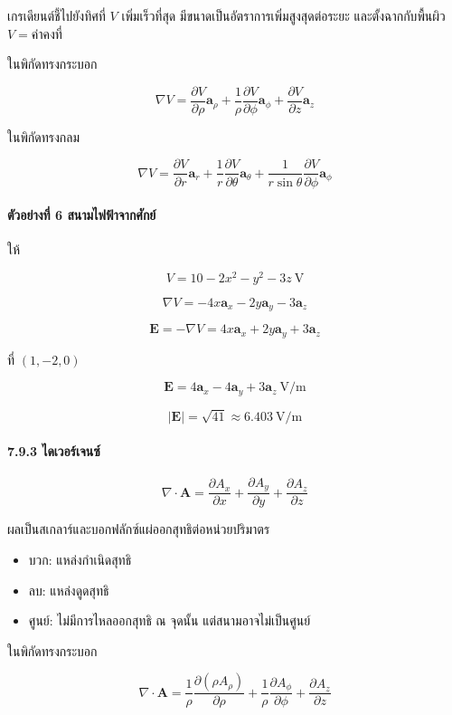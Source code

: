 เกรเดียนต์ชี้ไปยังทิศที่ \(V\) เพิ่มเร็วที่สุด มีขนาดเป็นอัตราการเพิ่มสูงสุดต่อระยะ และตั้งฉากกับพื้นผิว \(V=\text{ค่าคงที่}\)

ในพิกัดทรงกระบอก

\[
\nabla V=
\frac{\partial V}{\partial\rho}\mathbf{a}_\rho+
\frac{1}{\rho}\frac{\partial V}{\partial\phi}\mathbf{a}_\phi+
\frac{\partial V}{\partial z}\mathbf{a}_z
\]

ในพิกัดทรงกลม

\[
\nabla V=
\frac{\partial V}{\partial r}\mathbf{a}_r+
\frac{1}{r}\frac{\partial V}{\partial\theta}\mathbf{a}_\theta+
\frac{1}{r\sin\theta}\frac{\partial V}{\partial\phi}\mathbf{a}_\phi
\]

\paragraph{ตัวอย่างที่ 6 สนามไฟฟ้าจากศักย์}

ให้

\[
V=10-2x^2-y^2-3z\ \text{V}
\]

\[
\nabla V=-4x\mathbf{a}_x-2y\mathbf{a}_y-3\mathbf{a}_z
\]

\[
\mathbf{E}=-\nabla V
=4x\mathbf{a}_x+2y\mathbf{a}_y+3\mathbf{a}_z
\]

ที่ \((1,-2,0)\)

\[
\boxed{\mathbf{E}=4\mathbf{a}_x-4\mathbf{a}_y+3\mathbf{a}_z\ \text{V/m}}
\]

\[
|\mathbf{E}|=\sqrt{41}\approx6.403\ \text{V/m}
\]

\paragraph{7.9.3 ไดเวอร์เจนซ์}

\[
\nabla\cdot\mathbf{A}
=\frac{\partial A_x}{\partial x}
+\frac{\partial A_y}{\partial y}
+\frac{\partial A_z}{\partial z}
\]

ผลเป็นสเกลาร์และบอกฟลักซ์แผ่ออกสุทธิต่อหน่วยปริมาตร

\begin{itemize}
\item บวก: แหล่งกำเนิดสุทธิ
\item ลบ: แหล่งดูดสุทธิ
\item ศูนย์: ไม่มีการไหลออกสุทธิ ณ จุดนั้น แต่สนามอาจไม่เป็นศูนย์
\end{itemize}

ในพิกัดทรงกระบอก

\[
\nabla\cdot\mathbf{A}
=\frac{1}{\rho}\frac{\partial(\rho A_\rho)}{\partial\rho}
+\frac{1}{\rho}\frac{\partial A_\phi}{\partial\phi}
+\frac{\partial A_z}{\partial z}
\]

